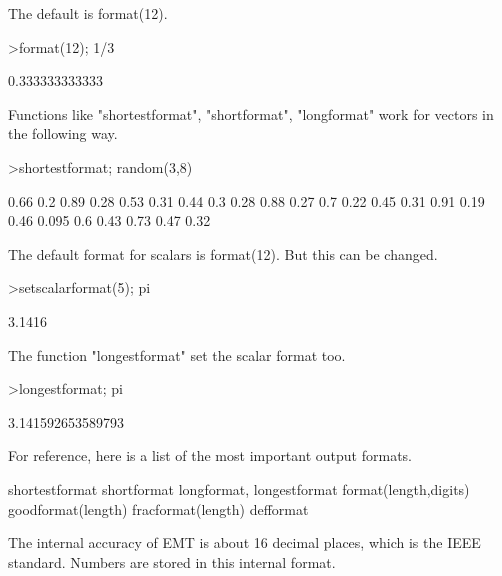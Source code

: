 \documentclass{article}
\begin{document}
\begin{eulernotebook}
\begin{eulercomment}
The default is format(12).
\end{eulercomment}
\begin{eulerprompt}
>format(12); 1/3
\end{eulerprompt}
\begin{euleroutput}
  0.333333333333
\end{euleroutput}
\begin{eulercomment}
Functions like "shortestformat", "shortformat", "longformat" work for vectors
in the following way.
\end{eulercomment}
\begin{eulerprompt}
>shortestformat; random(3,8)
\end{eulerprompt}
\begin{euleroutput}
    0.66    0.2   0.89   0.28   0.53   0.31   0.44    0.3 
    0.28   0.88   0.27    0.7   0.22   0.45   0.31   0.91 
    0.19   0.46  0.095    0.6   0.43   0.73   0.47   0.32 
\end{euleroutput}
\begin{eulercomment}
The default format for scalars is format(12). But this can be changed.
\end{eulercomment}
\begin{eulerprompt}
>setscalarformat(5); pi
\end{eulerprompt}
\begin{euleroutput}
  3.1416
\end{euleroutput}
\begin{eulercomment}
The function "longestformat" set the scalar format too.
\end{eulercomment}
\begin{eulerprompt}
>longestformat; pi
\end{eulerprompt}
\begin{euleroutput}
  3.141592653589793
\end{euleroutput}
\begin{eulercomment}
For reference, here is a list of the most important output formats.

\end{eulercomment}
\begin{eulerttcomment}
 shortestformat shortformat longformat, longestformat
 format(length,digits) goodformat(length)
 fracformat(length)
 defformat
\end{eulerttcomment}
\begin{eulercomment}

The internal accuracy of EMT is about 16 decimal places, which is the IEEE
standard. Numbers are stored in this internal format.


\end{eulercomment}
\end{eulernotebook}
\end{document}
